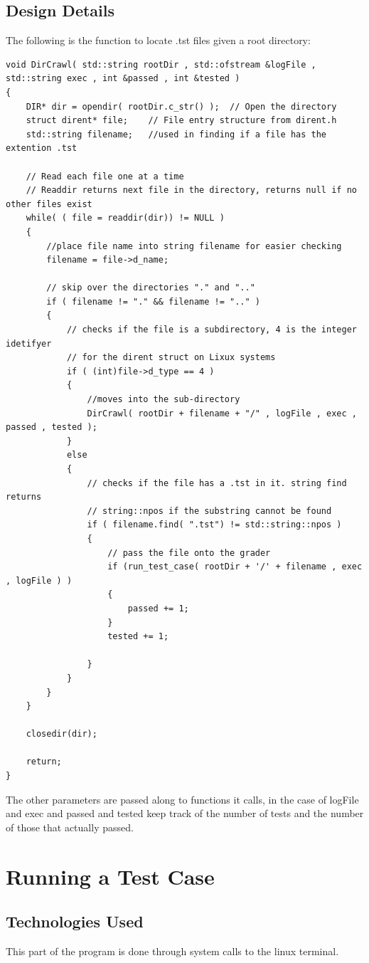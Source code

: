 \subsection{Design Details}
The following is the function to locate .tst files given a root directory:
\begin{lstlisting}
void DirCrawl( std::string rootDir , std::ofstream &logFile , std::string exec , int &passed , int &tested )
{
	DIR* dir = opendir( rootDir.c_str() );	// Open the directory
	struct dirent* file;	// File entry structure from dirent.h
	std::string filename;	//used in finding if a file has the extention .tst

	// Read each file one at a time
	// Readdir returns next file in the directory, returns null if no other files exist
	while( ( file = readdir(dir)) != NULL )
	{
		//place file name into string filename for easier checking
		filename = file->d_name;

		// skip over the directories "." and ".."
		if ( filename != "." && filename != ".." )
		{
			// checks if the file is a subdirectory, 4 is the integer idetifyer
			// for the dirent struct on Lixux systems
			if ( (int)file->d_type == 4 )
			{
				//moves into the sub-directory
                DirCrawl( rootDir + filename + "/" , logFile , exec , passed , tested );
			}
			else
			{
				// checks if the file has a .tst in it. string find returns
				// string::npos if the substring cannot be found
				if ( filename.find( ".tst") != std::string::npos )
				{
					// pass the file onto the grader 
                    if (run_test_case( rootDir + '/' + filename , exec , logFile ) )
					{
						passed += 1;
					}
					tested += 1;

				}
			}
		}
	}

	closedir(dir);

	return;
}
\end{lstlisting}
The other parameters are passed along to functions it calls, in the case of logFile and exec and passed and tested 
keep track of the number of tests and the number of those that actually passed.


\section{Running a Test Case }

\subsection{Technologies  Used}
This part of the program is done through system calls to the linux terminal. 


